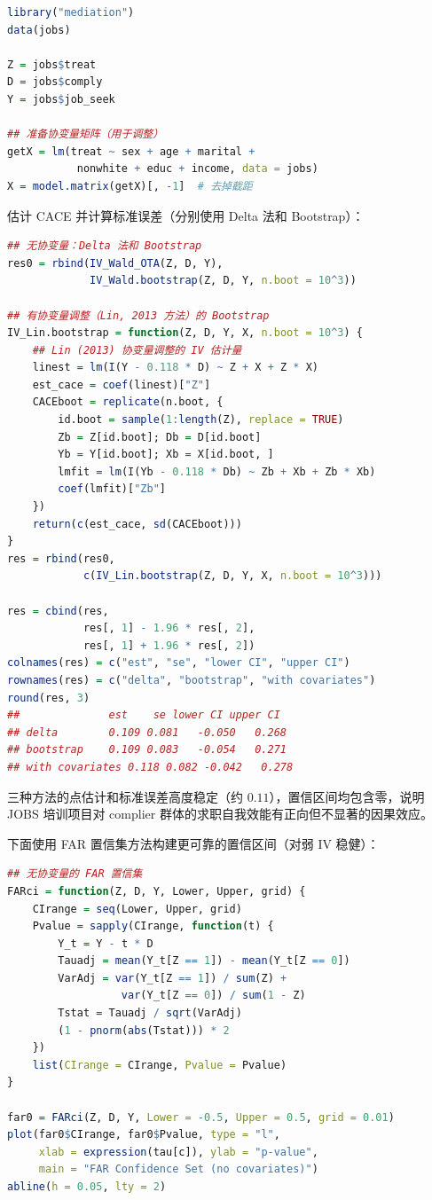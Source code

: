 \begin{lstlisting}[language=R]
library("mediation")
data(jobs)

Z = jobs$treat
D = jobs$comply
Y = jobs$job_seek

## 准备协变量矩阵（用于调整）
getX = lm(treat ~ sex + age + marital +
           nonwhite + educ + income, data = jobs)
X = model.matrix(getX)[, -1]  # 去掉截距
\end{lstlisting}

估计 CACE 并计算标准误差（分别使用 Delta 法和 Bootstrap）：

\begin{lstlisting}[language=R]
## 无协变量：Delta 法和 Bootstrap
res0 = rbind(IV_Wald_OTA(Z, D, Y),
             IV_Wald.bootstrap(Z, D, Y, n.boot = 10^3))

## 有协变量调整（Lin, 2013 方法）的 Bootstrap
IV_Lin.bootstrap = function(Z, D, Y, X, n.boot = 10^3) {
    ## Lin (2013) 协变量调整的 IV 估计量
    linest = lm(I(Y - 0.118 * D) ~ Z + X + Z * X)
    est_cace = coef(linest)["Z"]
    CACEboot = replicate(n.boot, {
        id.boot = sample(1:length(Z), replace = TRUE)
        Zb = Z[id.boot]; Db = D[id.boot]
        Yb = Y[id.boot]; Xb = X[id.boot, ]
        lmfit = lm(I(Yb - 0.118 * Db) ~ Zb + Xb + Zb * Xb)
        coef(lmfit)["Zb"]
    })
    return(c(est_cace, sd(CACEboot)))
}
res = rbind(res0,
            c(IV_Lin.bootstrap(Z, D, Y, X, n.boot = 10^3)))

res = cbind(res,
            res[, 1] - 1.96 * res[, 2],
            res[, 1] + 1.96 * res[, 2])
colnames(res) = c("est", "se", "lower CI", "upper CI")
rownames(res) = c("delta", "bootstrap", "with covariates")
round(res, 3)
##              est    se lower CI upper CI
## delta        0.109 0.081   -0.050   0.268
## bootstrap    0.109 0.083   -0.054   0.271
## with covariates 0.118 0.082 -0.042   0.278
\end{lstlisting}

三种方法的点估计和标准误差高度稳定（约 $0.11$），置信区间均包含零，说明 JOBS 培训项目对 complier 群体的求职自我效能有正向但不显著的因果效应。

下面使用 FAR 置信集方法构建更可靠的置信区间（对弱 IV 稳健）：

\begin{lstlisting}[language=R]
## 无协变量的 FAR 置信集
FARci = function(Z, D, Y, Lower, Upper, grid) {
    CIrange = seq(Lower, Upper, grid)
    Pvalue = sapply(CIrange, function(t) {
        Y_t = Y - t * D
        Tauadj = mean(Y_t[Z == 1]) - mean(Y_t[Z == 0])
        VarAdj = var(Y_t[Z == 1]) / sum(Z) +
                  var(Y_t[Z == 0]) / sum(1 - Z)
        Tstat = Tauadj / sqrt(VarAdj)
        (1 - pnorm(abs(Tstat))) * 2
    })
    list(CIrange = CIrange, Pvalue = Pvalue)
}

far0 = FARci(Z, D, Y, Lower = -0.5, Upper = 0.5, grid = 0.01)
plot(far0$CIrange, far0$Pvalue, type = "l",
     xlab = expression(tau[c]), ylab = "p-value",
     main = "FAR Confidence Set (no covariates)")
abline(h = 0.05, lty = 2)
\end{lstlisting}

